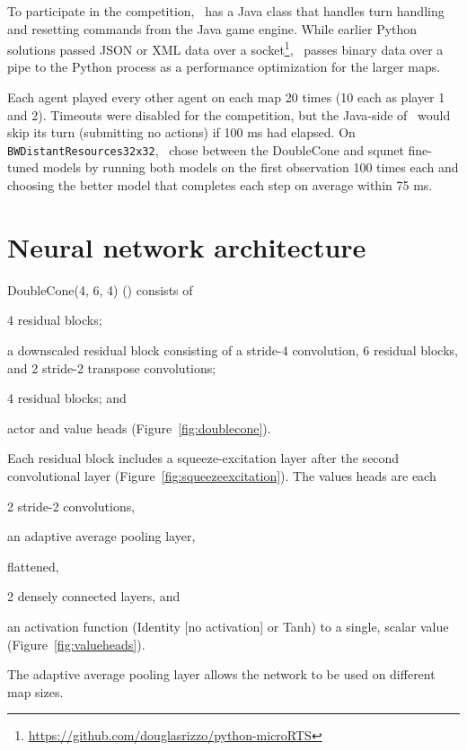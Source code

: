 \documentclass{article}
\begin{document}
To participate in the competition, \agentName\ has a Java class that handles turn
handling and resetting commands from the Java game engine. While earlier Python
solutions  passed JSON or XML data over a
socket\footnote{\url{https://github.com/douglasrizzo/python-microRTS}}, \agentName\
passes binary data over a pipe to the Python process as a performance optimization for
the larger maps.

Each agent played every other agent on each map 20 times (10 each as player 1 and 2).
Timeouts were disabled for the competition, but the Java-side of \agentName\ would skip
its turn (submitting no actions) if 100 ms had elapsed. On
\texttt{BWDistantResources32x32}, \agentName\ chose between the DoubleCone and squnet
fine-tuned models by running both models on the first observation 100 times each and
choosing the better model that completes each step on average within 75 ms.


\section{Neural network architecture}
DoubleCone(4, 6, 4) (\citep{Ferdinand2021doublecone}) consists of
\begin{inparaenum}[(1)]
    \item 4 residual blocks;
    \item a downscaled residual block consisting of a stride-4 convolution, 6 residual blocks, and
        2 stride-2 transpose convolutions;
    \item 4 residual blocks; and
    \item actor and value heads (Figure~\ref{fig:doublecone}).
\end{inparaenum}
Each residual block includes a squeeze-excitation layer after the second convolutional
layer (Figure~\ref{fig:squeezeexcitation}).  The values heads are each 
\begin{inparaenum}[(1)]
    \item 2 stride-2 convolutions,
    \item an adaptive average pooling layer,
    \item flattened,
    \item 2 densely connected layers, and
    \item an activation function (Identity [no activation] or Tanh) to a single, scalar value (Figure~\ref{fig:valueheads}).
\end{inparaenum}
The adaptive average pooling layer allows the network to be used on different map sizes.
\end{document}
